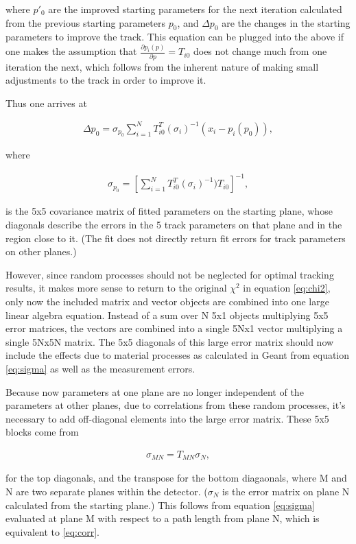 \documentclass{article}
\begin{document}
where $p'_{0}$ are the improved starting parameters for the next iteration calculated from the previous starting parameters $p_{0}$, and $\Delta p_{0}$ are the changes in the starting parameters to improve the track. This equation can be plugged into the above if one makes the assumption that $\frac{\partial p_{i}(p)}{\partial p} = T_{i0}$ does not change much from one iteration the next, which follows from the inherent nature of making small adjustments to the track in order to improve it.

Thus one arrives at 

\begin{align} \label{eq:deltap}
\Delta p_{0} = \sigma_{p_{0}} \sum_{i=1}^{N} T^{T}_{i0}(\sigma_{i})^{-1}(x_{i} - p_{i}(p_{0})),
\end{align}

where

\begin{align} \label{eq:cov}
\sigma_{p_{0}} = [\sum_{i=1}^{N} T^{T}_{i0} (\sigma_{i})^{-1}) T_{i0} ]^{-1},
\end{align}

is the 5x5 covariance matrix of fitted parameters on the starting plane, whose diagonals describe the errors in the 5 track parameters on that plane and in the region close to it. (The fit does not directly return fit errors for track parameters on other planes.) 

However, since random processes should not be neglected for optimal tracking results, it makes more sense to return to the original $\chi^2$ in equation \ref{eq:chi2}, only now the included matrix and vector objects are combined into one large linear algebra equation. Instead of a sum over N 5x1 objects multiplying 5x5 error matrices, the vectors are combined into a single 5Nx1 vector multiplying a single 5Nx5N matrix. The 5x5 diagonals of this large error matrix should now include the effects due to material processes as calculated in Geant from equation \ref{eq:sigma} as well as the measurement errors. 

Because now parameters at one plane are no longer independent of the parameters at other planes, due to correlations from these random processes, it's necessary to add off-diagonal elements into the large error matrix. These 5x5 blocks come from 

\begin{align} \label{eq:corr}
\sigma_{MN} = T_{MN} \sigma_{N}, 
\end{align}

for the top diagonals, and the transpose for the bottom diagaonals, 
where M and N are two separate planes within the detector. ($\sigma_{N}$ is the error matrix on plane N calculated from the starting plane.) This follows from equation \ref{eq:sigma} evaluated at plane M with respect to a path length from plane N, which is equivalent to \ref{eq:corr}. 
\end{document}
